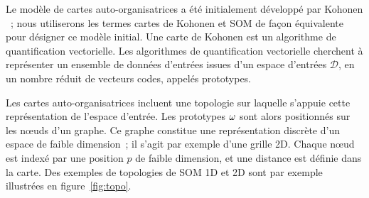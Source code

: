 \documentclass[../main]{subfiles}
\begin{document}
Le modèle de cartes auto-organisatrices a été initialement développé par Kohonen \parencite{Kohonen1982}~; nous utiliserons les termes cartes de Kohonen et SOM de façon équivalente pour désigner ce modèle initial.
Une carte de Kohonen est un algorithme de quantification vectorielle. 
Les algorithmes de quantification vectorielle cherchent à représenter un ensemble de données d'entrées issues d'un espace d'entrées $\mathcal{D}$, en un nombre réduit de vecteurs codes, appelés prototypes.


Les cartes auto-organisatrices incluent une topologie sur laquelle s'appuie cette représentation de l'espace d'entrée. 
Les prototypes $\omega$ sont alors positionnés sur les n\oe{}uds d'un graphe.
Ce graphe constitue une représentation discrète d'un espace de faible dimension~; il s'agit par exemple d'une grille 2D. Chaque n\oe{}ud est indexé par une position $p$ de faible dimension, et une distance est définie dans la carte.
Des exemples de topologies de SOM 1D et 2D sont par exemple illustrées en figure~\ref{fig:topo}.
\end{document}
